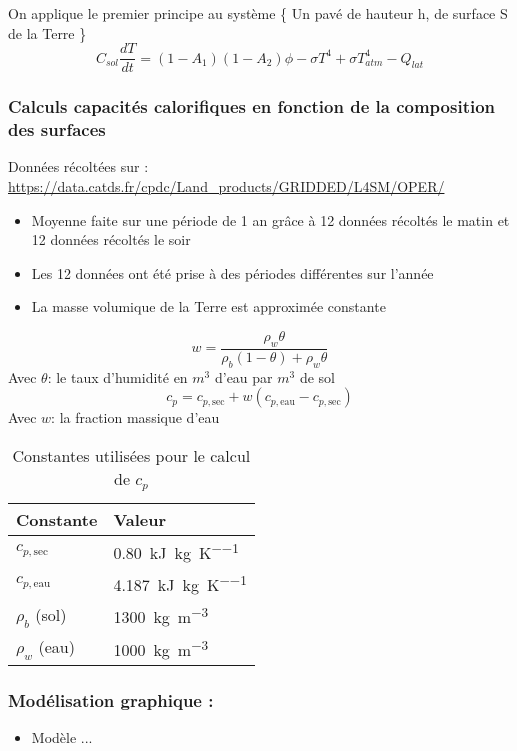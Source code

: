 \documentclass[a4paper,12pt]{article}
\begin{document}
On applique le premier principe au système \{ Un pavé de hauteur h, de surface S de la Terre \}
\ \ 
\[
C_{sol} \frac{dT}{dt} =(1-A_1)(1-A_2)\phi-\sigma T^4+\sigma T_{atm}^4-Q_{lat}
\]

\subsubsection*{Calculs capacités calorifiques en fonction de la composition des surfaces}
Données récoltées sur : 
\url{https://data.catds.fr/cpdc/Land_products/GRIDDED/L4SM/OPER/}

\begin{itemize}
    \item Moyenne faite sur une période de 1 an grâce à 12 données récoltés le matin et 12 données récoltés le soir 
    \item Les 12 données ont été prise à des périodes différentes sur l'année 
    \item La masse volumique de la Terre est approximée constante 
\end{itemize}
\[
w = \frac{\rho_w \theta}{\rho_b (1 - \theta) + \rho_w \theta}
\]
Avec \(\theta\): le taux d'humidité en \(m^3\) d'eau par \(m^3\) de sol 
\[
c_p = c_{p,\text{sec}} + w (c_{p,\text{eau}} - c_{p,\text{sec}})
\]
Avec \(w\): la fraction massique d'eau 
\begin{table}[h!]
\centering
\begin{tabular}{ll}
\textbf{Constante} & \textbf{Valeur} \\
\hline
$c_{p,\text{sec}}$ & \SI{0.80}{\kilo\joule\per\kilogram\per\kelvin} \\
$c_{p,\text{eau}}$ & \SI{4.187}{\kilo\joule\per\kilogram\per\kelvin} \\
$\rho_b$ (sol) & \SI{1300}{\kilogram\per\cubic\metre} \\
$\rho_w$ (eau) & \SI{1000}{\kilogram\per\cubic\metre} \\
\end{tabular}
\caption*{Constantes utilisées pour le calcul de $c_p$}
\end{table}














\subsubsection*{Modélisation graphique :} 
\begin{itemize}
    \item Modèle ...
\end{itemize}
\end{document}
